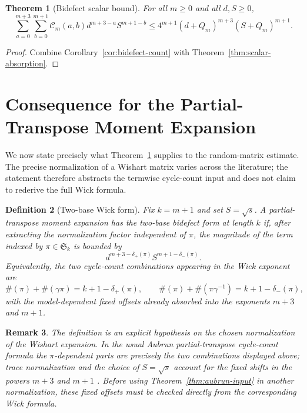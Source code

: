 \documentclass[11pt]{article}
\numberwithin{equation}{section}
\newtheorem{theorem}{Theorem}[section]
\newtheorem{definition}[theorem]{Definition}
\newtheorem{remark}[theorem]{Remark}
\newcommand{\Sym}{\mathfrak S}
\newcommand{\cyc}{\#}
\newcommand{\g}{\gamma}
\newcommand{\ddp}{\delta_{+}}
\newcommand{\ddm}{\delta_{-}}
\newcommand{\Count}{\mathcal C}
\newcommand{\Loss}{Q}
\begin{document}
\begin{theorem}[Bidefect scalar bound]\label{thm:main}
For all \(m\ge0\) and all \(d,S\ge0\),
\[
  \sum_{a=0}^{m+3}\sum_{b=0}^{m+1}
    \Count_m(a,b)d^{m+3-a}S^{m+1-b}
  \le
  4^{m+1}(d+\Loss_m)^{m+3}(S+\Loss_m)^{m+1}.
\]
\end{theorem}

\begin{proof}
Combine Corollary~\ref{cor:bidefect-count} with
Theorem~\ref{thm:scalar-absorption}.
\end{proof}

\section{Consequence for the Partial-Transpose Moment Expansion}
\label{sec:moment-input}

We now state precisely what Theorem~\ref{thm:main} supplies to the
random-matrix estimate.  The precise normalization of a Wishart matrix varies
across the literature; the statement therefore abstracts the termwise
cycle-count input and does not claim to rederive the full Wick formula.

\begin{definition}[Two-base Wick form]
Fix \(k=m+1\) and set \(S=\sqrt{s}\).  A partial-transpose moment expansion
has the two-base bidefect form at length \(k\) if, after extracting the
normalization factor independent of \(\pi\), the magnitude of the term indexed
by \(\pi\in\Sym_k\) is bounded by
\[
  d^{m+3-\ddp(\pi)}S^{m+1-\ddm(\pi)}.
\]
Equivalently, the two cycle-count combinations appearing in the Wick exponent
are
\[
  \cyc(\pi)+\cyc(\g\pi)=k+1-\ddp(\pi),
  \qquad
  \cyc(\pi)+\cyc(\pi\g^{-1})=k+1-\ddm(\pi),
\]
with the model-dependent fixed offsets already absorbed into the exponents
\(m+3\) and \(m+1\).
\end{definition}

\begin{remark}
The definition is an explicit hypothesis on the chosen normalization of the
Wishart expansion.  In the usual Aubrun partial-transpose cycle-count formula
the \(\pi\)-dependent parts are precisely the two combinations displayed
above; trace normalization and the choice of \(S=\sqrt{s}\) account for the
fixed shifts in the powers \(m+3\) and \(m+1\)
\cite{aubrun_partial_2012,aubrun_entanglement_2014}.  Before using
Theorem~\ref{thm:aubrun-input} in another normalization, these fixed offsets
must be checked directly from the corresponding Wick formula.
\end{remark}
\end{document}
